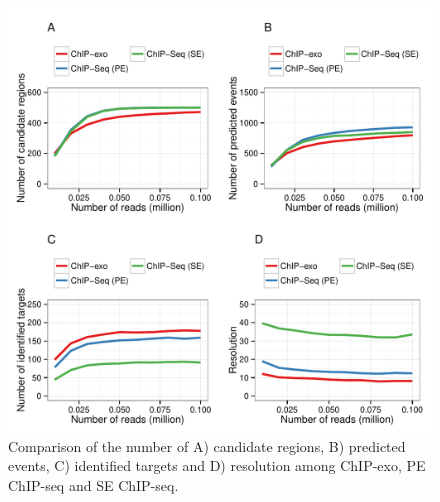 \documentclass{bmcart}
\begin{document}
\begin{figure}[h]
  \centering
  \includegraphics[width = .9\textwidth]{figures/fig7/saturation_analysis_old.pdf}
  \caption{Comparison of the number of A) candidate regions, B)
    predicted events, C) identified targets and D) resolution among
    ChIP-exo, PE ChIP-seq and SE ChIP-seq.}
  \label{fig:7}
\end{figure}

\end{document}
